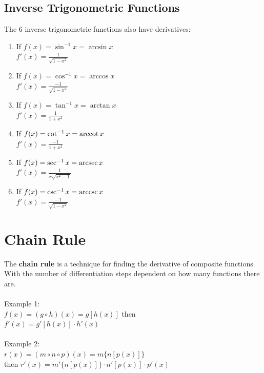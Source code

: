 \subsection{Inverse Trigonometric Functions}
The 6 inverse trigonometric functions also have derivatives:\\
\begin{enumerate}
  \item If $f(x) = \sin^{-1}x = \arcsin x$\\
    $f'(x) = \frac{1}{\sqrt{1-x^2}}$\\
  \item If $f(x) = \cos^{-1}x = \arccos x$\\
    $f'(x) = \frac{-1}{\sqrt{1-x^2}}$\\
  \item If $f(x) = \tan^{-1}x = \arctan x$\\
    $f'(x) = \frac{1}{1+x^2}$\\
  \item If $f(x) = \cot^{-1}x = \operatorname{arccot} x$\\
    $f'(x) = \frac{-1}{1+x^2}$\\
  \item If $f(x) = \sec^{-1}x = \operatorname{arcsec} x$\\
    $f'(x) = \frac{1}{x\sqrt{x^2-1}}$\\
  \item If $f(x) = \csc^{-1}x = \operatorname{arccsc} x$\\
    $f'(x) = \frac{-1}{\sqrt{1-x^2}}$\\
\end{enumerate}

\section{Chain Rule}
The \textbf{chain rule} is a technique for finding the derivative of composite functions. With the number of differentiation steps dependent on how many functions there are. \\
\\Example 1:\\ $f(x) = (g \circ h)(x) = g[h(x)]$ then \\
$f'(x) = g'[h(x)] \cdot h'(x)$
\\\\
Example 2:\\$r(x) = (m \circ n \circ p)(x) = m\{n[p(x)]\}$\\
then $r'(x) = m'\{n[p(x)]\} \cdot n'[p(x)] \cdot p'(x)$

